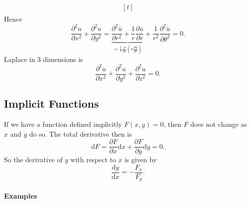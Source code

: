\documentclass[12pt]{report}
\theoremstyle{definition}
\begin{document}
\begin{enumerate}[label = (\roman*)]
\[\begin{align*}
\begin{aligned}[t]
        \end{aligned}
    \end{align*}
\]
Hence\[
    \frac{\partial^{2}u}{\partial x^{2}} + \frac{\partial^{2}u}{\partial y^{2}}
    = \underbrace{\frac{\partial^{2}\overline{u}}{\partial r^{2}} + \frac{1}{r}
    \frac{\partial \overline{u}}{\partial r}}_\text{$=\frac{1}{r}\frac{\partial}{\partial r} 
\left(r\frac{\partial \overline{u}}{\partial r} \right) $} 
    + \frac{1}{r^{2}} \frac{\partial^{2}\overline{u}}{\partial \theta^{2}} = 0.
\]
Laplace in 3 dimensions is\[
    \frac{\partial^{2}u}{\partial x^{2}} + \frac{\partial^{2}u}{\partial y^{2}} + \frac{\partial^{2}u}{\partial z^{2}} = 0.
\]
\end{enumerate}

\subsection{Implicit Functions}

If we have a function defined implicitly $F(x,y) = 0$,
then $F$ does not change as $x$ and $y$ do so.
The total derivative then is\[
    \mathrm{d}F = \frac{\partial F}{\partial x} \mathrm{d}x + \frac{\partial F}{\partial y} \mathrm{d}y = 0.
\]So the derivative of $y$ with respect to $x$ is given by\[
    \frac{\mathrm{d}y}{\mathrm{d}x} = -\frac{F_x}{F_y}.
\]

\paragraph{Examples}
\,
\end{document}

